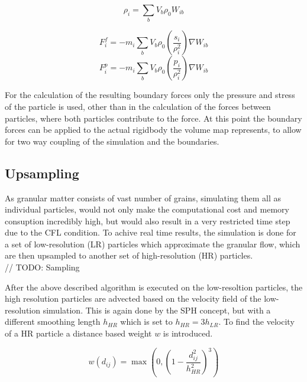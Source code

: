 \documentclass[intern]{cgMA}
\begin{document}
    \begin{equation}
        \rho_i = \sum_b V_b \rho_0 W_{ib}
    \end{equation}

    \begin{equation}
        F_i^f = -m_i \sum_{b} V_b \rho_0 (\frac{s_i}{\rho_i^2}) \nabla W_{ib}
    \end{equation}
    \begin{equation}
        F_i^p = -m_i \sum_{b} V_b \rho_0 (\frac{p_i}{\rho_i^2}) \nabla W_{ib}
    \end{equation}

    For the calculation of the resulting boundary forces only the pressure and stress of the particle is used, other than in the calculation of the forces between particles, where both particles contribute to the force. At this point the boundary forces can be applied to the actual rigidbody the volume map represents, to allow for two way coupling of the simulation and the boundaries.

    \subsection{Upsampling}
    As granular matter consists of vast number of grains, simulating them all as individual particles, would not only make the computational cost and memory consuption incredibly high, but would also result in a very restricted time step due to the CFL condition. To achive real time results, the simulation is done for a set of low-resolution (LR) particles which approximate the granular flow, which are then upsampled to another set of high-resolution (HR) particles. \cite{10.2312:PE:vriphys:vriphys12:053-060}
    \\// TODO: Sampling

    After the above described algorithm is executed on the low-resoltion particles, the high resolution particles are advected based on the velocity field of the low-resolution simulation. This is again done by the SPH concept, but with a different smoothing length $h_{HR}$ which is set to $h_{HR} = 3h_{LR}$. To find the velocity of a HR particle a distance based weight $w$ is introduced.

    \begin{equation}
        w(d_{ij}) = \max(0, (1 - \frac{d_{ij}^2}{h_{HR}^2})^3)
    \end{equation}
\end{document}
